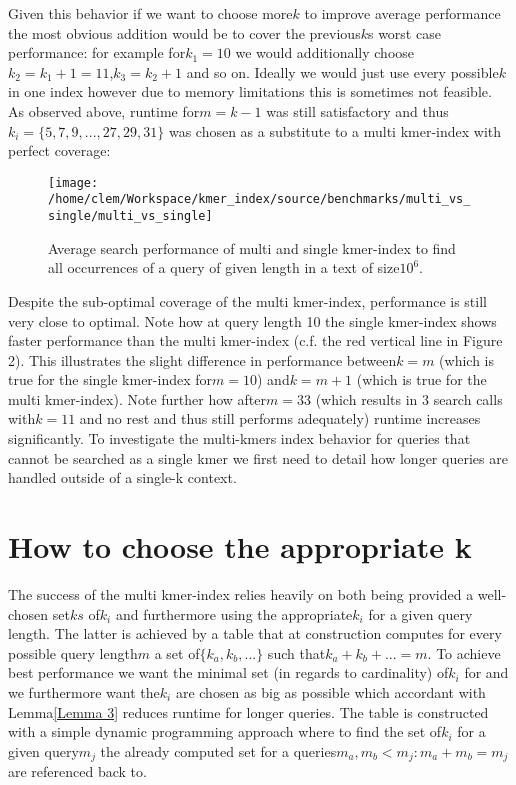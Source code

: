 Given this behavior if we want to choose more$k$ to improve average
performance the most obvious addition would be to cover the previous$k$s
worst case performance: for example for$k_{1}=10$ we would additionally
choose$k_{2}=k_{1}+1=11$,$k_{3}=k_{2}+1$ and so on. Ideally we would
just use every possible$k$ in one index however due to memory limitations
this is sometimes not feasible. As observed above, runtime for$m=k-1$
was still satisfactory and thus$k_{i}=\{5,7,9,...,27,29,31\}$ was
chosen as a substitute to a multi kmer-index with perfect coverage:

\begin{figure}[H]
\texttt{[image: /home/clem/Workspace/kmer\_index/source/benchmarks/multi\_vs\_single/multi\_vs\_single]}

\caption{Average search performance of multi and single kmer-index to find
all occurrences of a query of given length in a text of size$10^{6}$.}
\end{figure}

Despite the sub-optimal coverage of the multi kmer-index, performance
is still very close to optimal. Note how at query length 10 the single
kmer-index shows faster performance than the multi kmer-index (c.f.
the red vertical line in Figure 2). This illustrates the slight difference
in performance between$k=m$ (which is true for the single kmer-index
for$m=10$) and$k=m+1$ (which is true for the multi kmer-index).
Note further how after$m=33$ (which results in 3 search calls with$k=11$
and no rest and thus still performs adequately) runtime increases
significantly. To investigate the multi-kmers index behavior for queries
that cannot be searched as a single kmer we first need to detail how
longer queries are handled outside of a single-k context.

\section{\label{section 4.2}How to choose the appropriate k}

The success of the multi kmer-index relies heavily on both being provided
a well-chosen set$ks$ of$k_{i}$ and furthermore using the appropriate$k_{i}$
for a given query length. The latter is achieved by a table that at
construction computes for every possible query length$m$ a set of$\{k_{a},k_{b},...\}$
such that$k_{a}+k_{b}+...=m$. To achieve best performance we want
the minimal set (in regards to cardinality) of$k_{i}$ for and we
furthermore want the$k_{i}$ are chosen as big as possible which accordant
with Lemma\ref{Lemma 3} reduces runtime for longer queries. The table
is constructed with a simple dynamic programming approach where to
find the set of$k_{i}$ for a given query$m_{j}$ the already computed
set for a queries$m_{a},m_{b}<m_{j}:m_{a}+m_{b}=m_{j}$ are referenced
back to.

